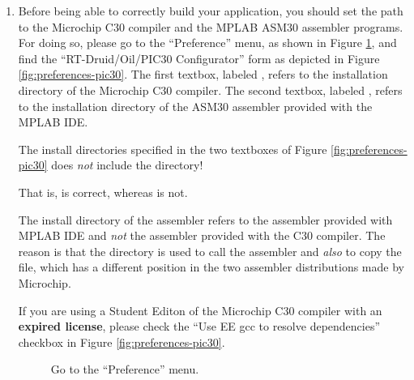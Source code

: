 \begin{enumerate}
\item
Before being able to correctly build your application, you should set
the path to the Microchip C30 compiler and the MPLAB ASM30 assembler
programs. For doing so, please go to the ``Preference'' menu, as shown
in Figure \ref{fig:preferences-menu}, and find the
``RT-Druid/Oil/PIC30 Configurator'' form as depicted in Figure
\ref{fig:preferences-pic30}.  The first textbox, labeled , refers to the installation directory of the Microchip C30
compiler. The second textbox, labeled , refers to the
installation directory of the ASM30 assembler provided with the MPLAB
IDE.

\begin{warning}
The install directories specified in the two textboxes of Figure
\ref{fig:preferences-pic30} does {\em not} include the 
directory! 

That is,  is correct, whereas
 is not.
\end{warning}

\begin{warning}
The install directory of the assembler refers to the assembler
provided with MPLAB IDE and {\em not} the assembler provided with the
C30 compiler. The reason is that the directory is used to call the
assembler and {\em also} to copy the  file, which has a
different position in the two assembler distributions made by
Microchip.
\end{warning}

\begin{warning}
If you are using a Student Editon of the Microchip C30 compiler with
an {\bf expired license}, please check the ``Use EE gcc to resolve
dependencies'' checkbox in Figure \ref{fig:preferences-pic30}.
\end{warning}

\begin{figure}[htb]
\caption{Go to the ``Preference'' menu.}
\label{fig:preferences-menu}
\end{figure}


\end{enumerate}
